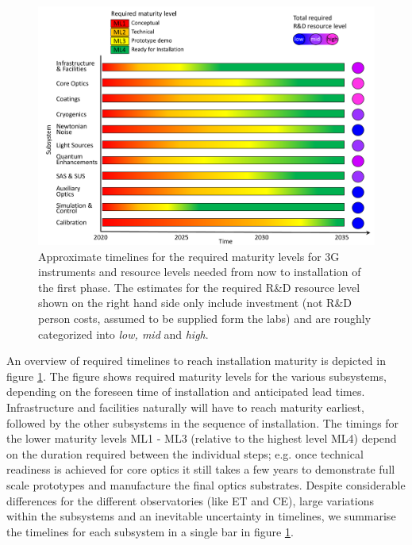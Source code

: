 \section*{}
\begin{figure}[ht]
\centering
\includegraphics*[width= \textwidth]{Figures/3G_Readiness_Levelsblue.pdf}
\caption{Approximate timelines for the required maturity levels for 3G instruments and resource levels needed from now to installation of the first phase. The estimates for the required R\&D resource level shown on the right hand side only include investment (not R\&D person costs, assumed to be supplied form the labs) and are roughly categorized into \textit{low, mid} and \textit{high}.\\
}
\label{fig:maturity}
\end{figure}

An overview of required timelines to reach installation maturity is depicted in figure \ref{fig:maturity}. The figure shows required maturity levels for the various subsystems, depending on the foreseen time of installation and anticipated lead times. Infrastructure and facilities naturally will have to reach maturity earliest, followed by the other subsystems in the sequence of installation. The timings for the lower maturity levels ML1 - ML3 (relative to the highest level ML4) depend on the duration required between the individual steps; e.g. once technical readiness is achieved for core optics it still takes a few years to demonstrate full scale prototypes and manufacture the final optics substrates. Despite considerable differences for the different observatories (like ET and CE), large variations within the subsystems and an inevitable uncertainty in timelines, we summarise the timelines  for each subsystem in a single bar in figure \ref{fig:maturity}.  

